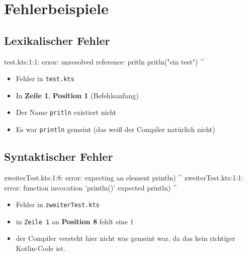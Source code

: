 \section{Fehlerbeispiele}
\subsection{Lexikalischer Fehler}
\begin{frame}[fragile]
    \slidehead
    \pause
    \begin{commandshell}[][minted language=text]
        test.kts:1:1: error: unresolved reference: pritln
        pritln("ein test")
        ^
    \end{commandshell}
    \pause
    \begin{itemize}[<+->]
        \item Fehler in \texttt{test.kts}
        \item In \textbf{Zeile 1}, \textbf{Position 1} (Befehlsanfang)
        \item Der Name \texttt{pritln} existiert nicht
        \item Es war \texttt{println} gemeint (das weiß der Compiler natürlich nicht)
    \end{itemize}
\end{frame}

\subsection{Syntaktischer Fehler}

\begin{frame}[fragile]
    \slidehead
    \pause
    \begin{commandshell}[fontsize=\small][minted language=text,top=0cm,bottom=0cm]
        zweiterTest.kts:1:8: error: expecting an element
        println)
               ^
        zweiterTest.kts:1:1: error: function invocation 'println()' expected
        println)
        ^
    \end{commandshell}
    \pause
    \begin{itemize}[<+->]
        \item Fehler in \texttt{zweiterTest.kts}
        \item in \texttt{Zeile 1} an \textbf{Position 8} fehlt eine \texttt{(}
        \item der Compiler versteht hier nicht was gemeint war, da das kein richtiger Kotlin-Code ist.
    \end{itemize}
\end{frame}

